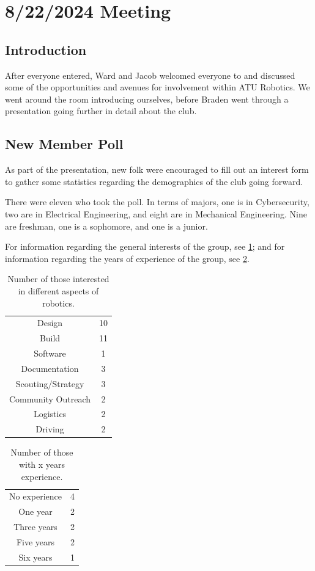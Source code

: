 
\section{8/22/2024 Meeting}
\subsection{Introduction}
After everyone entered, Ward and Jacob welcomed everyone to and discussed some of the opportunities and avenues for involvement within ATU Robotics. We went around the room introducing ourselves, before Braden went through a presentation going further in detail about the club. 

\subsection{New Member Poll}
As part of the presentation, new folk were encouraged to fill out an interest form to gather some statistics regarding the demographics of the club going forward. 

There were eleven who took the poll. In terms of majors, one is in Cybersecurity, two are in Electrical Engineering, and eight are in Mechanical Engineering. Nine are freshman, one is a sophomore, and one is a junior. 

For information regarding the general interests of the group, see \ref{tab:num_of_interest}; and for information regarding the years of experience of the group, see \ref{tab:num_of_years_exp}.

\begin{table}
    \centering
    \begin{tabular}{cc}
         Design& 10\\
         Build& 11\\
         Software& 1\\
         Documentation& 3\\
         Scouting/Strategy& 3\\
         Community Outreach& 2\\
         Logistics& 2\\
         Driving& 2\\
    \end{tabular}
    \caption{Number of those interested in different aspects of robotics.}
    \label{tab:num_of_interest}
\end{table}

\begin{table}
    \centering
    \begin{tabular}{cc}
         No experience& 4\\
         One year& 2\\
         Three years& 2\\
         Five years& 2\\
         Six years& 1\\
    \end{tabular}
    \caption{Number of those with x years experience.}
    \label{tab:num_of_years_exp}
\end{table}
